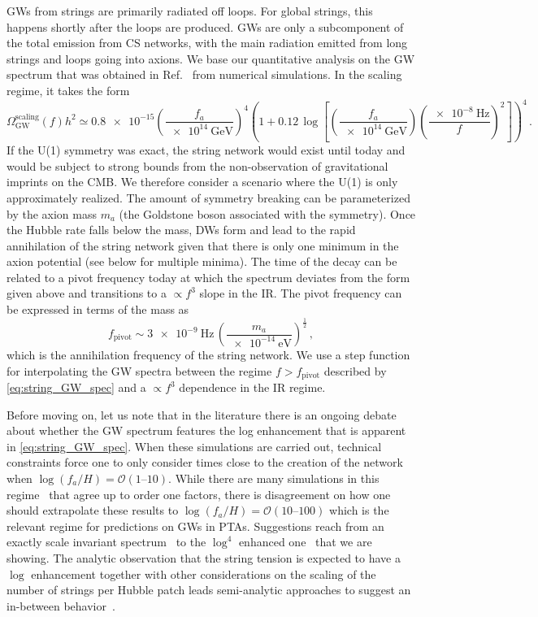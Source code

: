 \documentclass{article}
\newcommand*{\GW}{\ensuremath{\mathrm{GW}}\xspace}
\begin{document}
GWs from strings are primarily radiated off loops. For global strings, this happens shortly after the loops are produced.  
GWs are only a subcomponent of the total emission from CS networks, with the main radiation emitted from long strings and loops going into axions. We base our quantitative analysis on the GW spectrum that was obtained in Ref.~\cite{Gorghetto:2020qws} from numerical simulations. In the scaling regime, it takes the form
\begin{equation}\label{eq:string_GW_spec}
     \Omega_{\GW}^\mathrm{scaling}(f)h^2 \simeq \num{0.8e-15} \left(\frac{f_{a}}{\SI{e14}{\GeV}}\right)^{4}\left(1 + 0.12\, \log\left[\left(\frac{f_{a}}{\SI{e14}{\GeV}}\right) \left(\frac{\SI{e-8}{\Hz}}{f} \right)^{2} \right] \right)^{4} \,.
\end{equation}  
If the U(1) symmetry was exact, the string network would exist until today and would be subject to strong bounds from the non-observation of gravitational imprints on the CMB. We therefore consider a scenario where the U(1) is only approximately realized. The amount of symmetry breaking can be parameterized by the axion mass $m_a$ (the Goldstone boson associated with the symmetry). Once the Hubble rate falls below the mass, DWs form and lead to the rapid annihilation of the string network given that there is only one minimum in the axion potential (see below for multiple minima). The time of the decay can be related to a pivot frequency today at which the spectrum deviates from the form given above and transitions to a $\propto f^3$ slope in the IR.
The pivot frequency can be expressed in terms of the mass as
\begin{equation}
    f_\mathrm{pivot} \sim \SI{3e-9}{\Hz} \, \left(\frac{m_a}{\SI{e-14}{\eV}}\right)^{\frac{1}{2}}\,,
\end{equation}
which is the annihilation frequency of the string network. We use a step function for interpolating the GW spectra between the regime $f>f_{\mathrm{pivot}}$ described by \cref{eq:string_GW_spec} and a $\propto f^{3}$ dependence in the IR regime.

Before moving on, let us note that in the literature there is an ongoing debate about whether the GW spectrum features the log enhancement that is apparent in \cref{eq:string_GW_spec}. When these simulations are carried out, technical constraints force one to only consider times close to the creation of the network when $\log(f_a/H)=\mathcal{O}(\numrange{1}{10})$. While there are many simulations in this regime~\cite{Gorghetto:2018myk,Gorghetto:2021fsn,Buschmann:2021sdq,Figueroa:2020lvo} that agree up to order one factors, there is disagreement on how one should extrapolate these results to $\log(f_a/H)=\mathcal{O}(\numrange{10}{100})$ which is the relevant regime for predictions on GWs in PTAs. Suggestions reach from an exactly scale invariant spectrum~\cite{Figueroa:2020lvo,Hindmarsh:2021vih} to the $\log^4$ enhanced one~\cite{Gorghetto:2018myk,Gorghetto:2021fsn} that we are showing. The analytic observation that the string tension is expected to have a $\log$ enhancement together with other considerations on the scaling of the number of strings per Hubble patch leads semi-analytic approaches  to suggest an in-between behavior~\cite{Gouttenoire:2021jhk, Gouttenoire:2019kij, Chang:2021afa}. 
\end{document}
